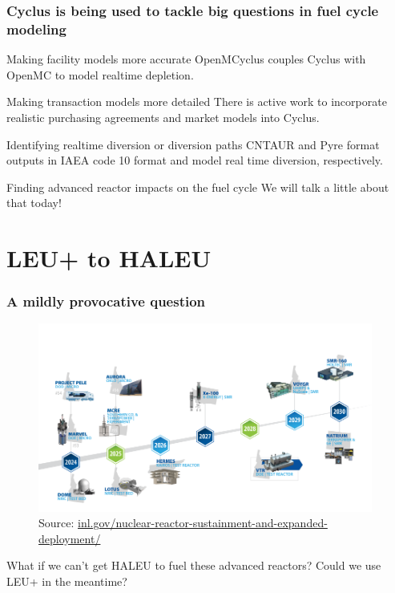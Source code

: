 \documentclass[9pt]{beamer}
\begin{document}
  \begin{frame}
    \frametitle{Cyclus is being used to tackle big questions in fuel cycle modeling}
    \begin{block}{Making facility models more accurate}
        OpenMCyclus \cite{openmcyclus_paper} couples Cyclus with OpenMC to model realtime depletion.
    \end{block}
    \begin{block}{Making transaction models more detailed}
        There is active work to incorporate realistic purchasing agreements and market models into Cyclus.
    \end{block}
    \begin{block}{Identifying realtime diversion or diversion paths}
        CNTAUR \cite{mummah_advanced_2024} and Pyre \cite{westphal_modeling_2019} format outputs in IAEA code 10 format and model real time diversion, respectively.
    \end{block}
    \begin{block}{Finding advanced reactor impacts on the fuel cycle}
        We will talk a little about that today!
    \end{block}
  \end{frame}

  \section{LEU+ to HALEU}
  \begin{frame}
    \frametitle{A mildly provocative question}
    \vspace{-25pt}
    \begin{figure}
        \centering
        \includegraphics[width=0.98\textwidth]{../images/reactor_timeline.png}
        \caption{Source: \url{inl.gov/nuclear-reactor-sustainment-and-expanded-deployment/}}
    \end{figure}
    \vspace{-8pt}
    What if we can't get HALEU to fuel these advanced reactors?
    Could we use LEU+ in the meantime?
  \end{frame}
\end{document}
